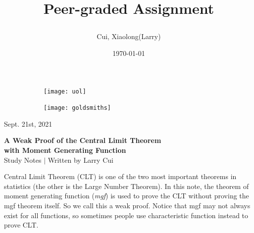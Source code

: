 \documentclass[11pt]{article}
\title{\vspace{-90pt} 



\textbf  {Peer-graded Assignment} }
\author{Cui, Xiaolong(Larry)}
\date{\today}
\begin{document}

\thispagestyle{plain}


\begin{figure}[H] %
  \begin{subfigure}{0.3\textwidth}
    \texttt{[image: uol]}
  \end{subfigure}
  \hfill
  \begin{subfigure}{0.3\textwidth}
    \texttt{[image: goldsmiths]}
  \end{subfigure}
\end{figure}


\begin{flushright}

\footnotesize {Sept. 21st,  2021}
\end{flushright}

\begin{center}
\textbf{A Weak Proof of the Central Limit Theorem \\
with Moment Generating Function} \\
\footnotesize {Study Notes $ | $ Written by Larry Cui}
\end{center}





\setcounter{figure}{0}

\vspace{10pt}


Central Limit Theorem (CLT) is one of the two most important theorems in statistics (the other is the Large Number Theorem).  In this note,  the theorem of moment generating function (\textit {mgf}) is used to prove the CLT without proving the mgf theorem itself.  So we call this a weak proof.  Notice that mgf may not always exist for all functions,  so sometimes people use characteristic function instead to prove CLT.
\end{document}

